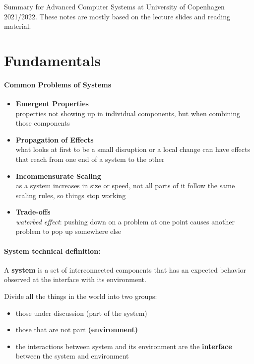 Summary for Advanced Computer Systems
at University of Copenhagen 2021/2022.
These notes are mostly based on the lecture slides and
reading material.

\section{Fundamentals}
\paragraph{Common Problems of Systems}
\begin{itemize}
\item \textbf{Emergent Properties} \\
  properties not showing up in individual components, but
  when combining those components

\item \textbf{Propagation of Effects} \\
  what looks at first to be a small disruption or
  a local change can have effects that reach from
  one end of a system to the other

\item \textbf{Incommensurate Scaling} \\
  as a system increases in size or speed, not all parts
  of it follow the same scaling rules, so things stop
  working

\item \textbf{Trade-offs} \\
  \textit{waterbed effect}: pushing down on a problem at one point causes
  another problem to pop up somewhere else

\end{itemize}

\paragraph{System technical definition:}
A \textbf{system} is a set of interconnected components that
has an expected behavior observed at the interface with its
environment.

Divide all the things in the world into two groups:
\begin{itemize}
\item those under discussion (part of the system)
\item those that are not part \textbf{(environment)}
\item the interactions between system and its environment
  are the \textbf{interface} between the system and environment
\end{itemize}


